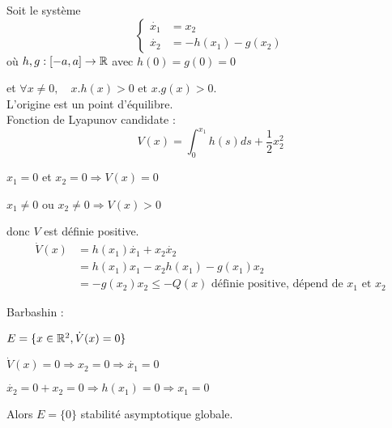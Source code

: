\documentclass[main.tex]{subfiles} \newcommand{\D}{\mathcal{D}}
\begin{document}
\begin{exemple}[Barbashin] Soit le système \[ \begin{cases} \dot{x_1} & =x_2\\
\dot{x_2} & = -h(x_1) - g(x_2) \end{cases} \] où $h,g:[-a,a] \rightarrow \mathbb{R}$
avec $h(0)=g(0)=0$

  et $\forall x \neq 0, \quad x.h(x) >0 \text{ et }  x.g(x) >0$.\\

  L'origine est un point d'équilibre.\\

  Fonction de Lyapunov candidate : \[ V(x) = \int_0^{x_1} h(s)ds +
  \frac{1}{2}x_2^2 \]

  $x_1 = 0$ et $x_2=0 \Rightarrow V(x)=0$

  $x_1 \neq 0$ ou $x_2 \neq 0 \Rightarrow V(x) > 0$

  donc $V$ est définie positive.\\

  \begin{align*} \dot{V}(x) & = h(x_1) \dot{x_1}+ x_2 \dot{x_2}\\ & = h(x_1)x_1
  - x_2h(x_1) - g(x_1)x_2 \\ & = -g(x_2)x_2 \leq -Q(x) \text{ définie positive,
  dépend de } x_1 \text{ et } x_2 \end{align*}

  Barbashin :

  $E = \{ x \in  \mathbb{R}^2, \dot{V}(x) = 0 \}$

  $\dot{V}(x)=0 \Rightarrow x_2 = 0 \Rightarrow \dot{x_1}=0$

  $\dot{x_2} = 0 + x_2 = 0 \Rightarrow h(x_1)=0 \Rightarrow x_1 = 0$

  Alors $E=\{0\}$ stabilité asymptotique globale.  \end{exemple}
\end{document}

